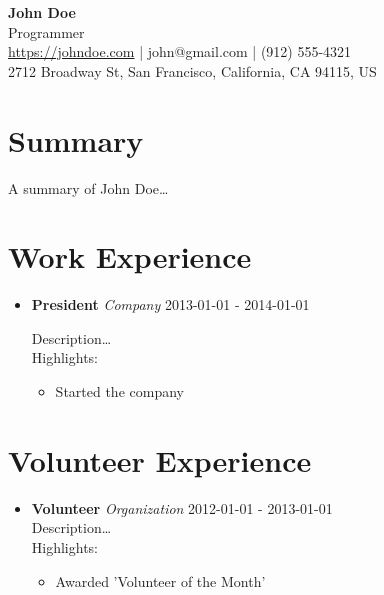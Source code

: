 \documentclass{article}
\newcommand{\entry}[2]{
    \textbf{#1} \hfill \textit{#2}
}
\begin{document}
\begin{flushleft}
    \textbf{\LARGE John Doe} \\
    Programmer \\
    \href{https://johndoe.com}{https://johndoe.com} | john@gmail.com | (912) 555-4321 \\
    2712 Broadway St, San Francisco, California, CA 94115, US
\end{flushleft}
\section*{Summary}
A summary of John Doe…\\
		

\section*{Work Experience}
\begin{itemize}[leftmargin=*]
		
  \item \entry{President}{Company} \hfill 2013-01-01 - 2014-01-01 

	\vspace{0.1in}

	Description… \\
	Highlights:
	\begin{itemize}
				
		\item Started the company				
					
	\end{itemize}
	\vspace{0.2in}
			
\end{itemize}
		

\section*{Volunteer Experience}
\begin{itemize}[leftmargin=*]
		
	\item \entry{Volunteer}{Organization} \hfill 2012-01-01 - 2013-01-01 \\
	Description… \\
	Highlights:
	\begin{itemize}
				
		\item Awarded 'Volunteer of the Month'
					
	\end{itemize}
			\end{itemize}
\end{document}
